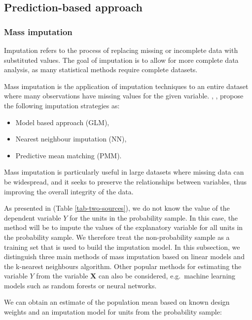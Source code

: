 \documentclass[
]{jss}
\begin{document}
\subsection{Prediction-based approach}\label{sec-prediction}

\subsubsection{Mass imputation}\label{mass-imputation}

Imputation refers to the process of replacing missing or incomplete data
with substituted values. The goal of imputation is to allow for more
complete data analysis, as many statistical methods require complete
datasets.

Mass imputation is the application of imputation techniques to an entire
dataset where many observations have missing values for the given
variable. \cite{kim_combining_2021}, \cite{yang2021integration},
\cite{Beres} propose the following imputation strategies as:

\begin{itemize}
    \item Model based approach (GLM),
    \item Nearest neighbour imputation (NN),
    \item Predictive mean matching (PMM).
\end{itemize}

Mass imputation is particularly useful in large datasets where missing
data can be widespread, and it seeks to preserve the relationships
between variables, thus improving the overall integrity of the data.

As presented in (Table \ref{tab-two-sources}), we do not know the value
of the dependent variable \(Y\) for the units in the probability sample.
In this case, the method will be to impute the values of the explanatory
variable for all units in the probability sample. We therefore treat the
non-probability sample as a training set that is used to build the
imputation model. In this subsection, we distinguish three main methods
of mass imputation based on linear models and the k-nearest neighbours
algorithm. Other popular methods for estimating the variable \(Y\) from
the variable \(\boldsymbol{X}\) can also be considered, e.g.~machine
learning models such as random forests or neural networks.

We can obtain an estimate of the population mean based on known design
weights and an imputation model for units from the probability sample:
\end{document}
